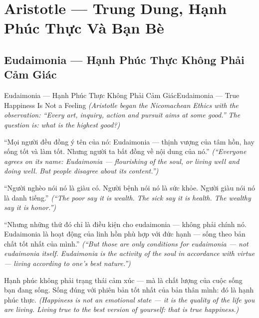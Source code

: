 \chapter{Aristotle — Trung Dung, Hạnh Phúc Thực Và Bạn Bè}

\section{Eudaimonia — Hạnh Phúc Thực Không Phải Cảm Giác}
\begin{truyen}{Eudaimonia — Hạnh Phúc Thực Không Phải Cảm Giác}{Eudaimonia — True Happiness Is Not a Feeling}
\textit{(Aristotle began the Nicomachean Ethics with the observation: ``Every art, inquiry, action and pursuit aims at some good.'' The question is: what is the highest good?)}

``Mọi người đều đồng ý tên của nó: Eudaimonia — thịnh vượng của tâm hồn, hay sống tốt và làm tốt. Nhưng người ta bất đồng về nội dung của nó.''
\textit{(``Everyone agrees on its name: Eudaimonia — flourishing of the soul, or living well and doing well. But people disagree about its content.'')}

``Người nghèo nói nó là giàu có. Người bệnh nói nó là sức khỏe. Người giàu nói nó là danh tiếng.''
\textit{(``The poor say it is wealth. The sick say it is health. The wealthy say it is honor.'')}

``Nhưng những thứ đó chỉ là điều kiện cho eudaimonia — không phải chính nó. Eudaimonia là hoạt động của linh hồn phù hợp với đức hạnh — sống theo bản chất tốt nhất của mình.''
\textit{(``But those are only conditions for eudaimonia — not eudaimonia itself. Eudaimonia is the activity of the soul in accordance with virtue — living according to one's best nature.'')}

\end{truyen}

\begin{baihoc}
Hạnh phúc không phải trạng thái cảm xúc — mà là chất lượng của cuộc sống bạn đang sống. Sống đúng với phiên bản tốt nhất của bản thân mình: đó là hạnh phúc thực.
\textit{(Happiness is not an emotional state — it is the quality of the life you are living. Living true to the best version of yourself: that is true happiness.)}
\end{baihoc}
\ngancach


